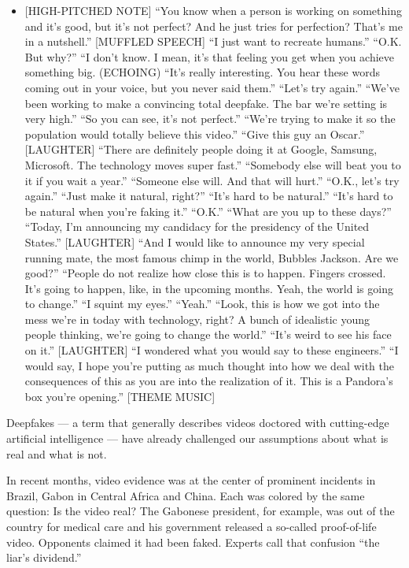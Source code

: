 \begin{itemize}
\tightlist
\item
  {[}HIGH-PITCHED NOTE{]} ``You know when a person is working on
  something and it's good, but it's not perfect? And he just tries for
  perfection? That's me in a nutshell.'' {[}MUFFLED SPEECH{]} ``I just
  want to recreate humans.'' ``O.K. But why?'' ``I don't know. I mean,
  it's that feeling you get when you achieve something big. (ECHOING)
  ``It's really interesting. You hear these words coming out in your
  voice, but you never said them.'' ``Let's try again.'' ``We've been
  working to make a convincing total deepfake. The bar we're setting is
  very high.'' ``So you can see, it's not perfect.'' ``We're trying to
  make it so the population would totally believe this video.'' ``Give
  this guy an Oscar.'' {[}LAUGHTER{]} ``There are definitely people
  doing it at Google, Samsung, Microsoft. The technology moves super
  fast.'' ``Somebody else will beat you to it if you wait a year.''
  ``Someone else will. And that will hurt.'' ``O.K., let's try again.''
  ``Just make it natural, right?'' ``It's hard to be natural.'' ``It's
  hard to be natural when you're faking it.'' ``O.K.'' ``What are you up
  to these days?'' ``Today, I'm announcing my candidacy for the
  presidency of the United States.'' {[}LAUGHTER{]} ``And I would like
  to announce my very special running mate, the most famous chimp in the
  world, Bubbles Jackson. Are we good?'' ``People do not realize how
  close this is to happen. Fingers crossed. It's going to happen, like,
  in the upcoming months. Yeah, the world is going to change.'' ``I
  squint my eyes.'' ``Yeah.'' ``Look, this is how we got into the mess
  we're in today with technology, right? A bunch of idealistic young
  people thinking, we're going to change the world.'' ``It's weird to
  see his face on it.'' {[}LAUGHTER{]} ``I wondered what you would say
  to these engineers.'' ``I would say, I hope you're putting as much
  thought into how we deal with the consequences of this as you are into
  the realization of it. This is a Pandora's box you're opening.''
  {[}THEME MUSIC{]}
\end{itemize}

Deepfakes --- a term that generally describes videos doctored with
cutting-edge artificial intelligence --- have already challenged our
assumptions about what is real and what is not.

In recent months, video evidence was at the center of prominent
incidents in Brazil, Gabon in Central Africa and China. Each was colored
by the same question: Is the video real? The Gabonese president, for
example, was out of the country for medical care and his government
released a so-called proof-of-life video. Opponents claimed it had been
faked. Experts call that confusion ``the liar's dividend.''

